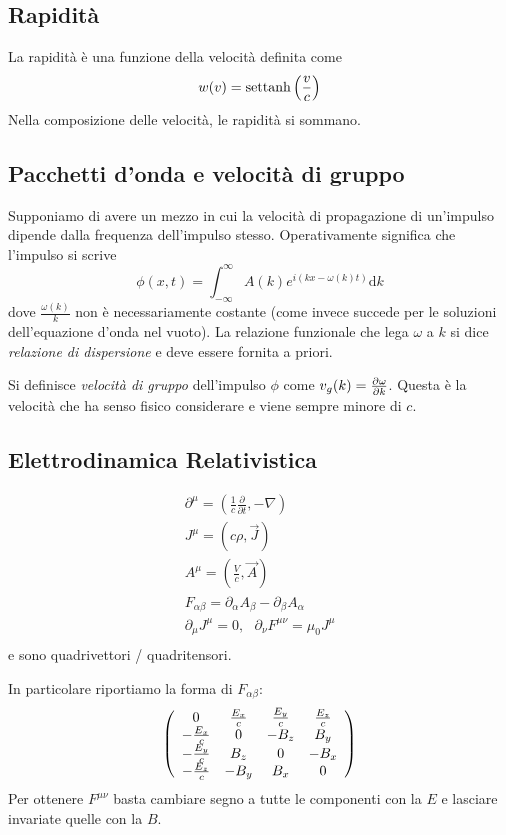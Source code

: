\documentclass[10pt,a4paper]{article}
\newcommand{\de}{{\ensuremath{ \mbox{d}}}}
\begin{document}
\begin{multicols}{2}
  \subsection*{Rapidità}
  La rapidità è una funzione della velocità definita come
  $$ w(v) = \text{settanh} \left({\frac{v}{c}}\right) $$
  Nella composizione delle velocità, le rapidità si sommano.

  \subsection*{Pacchetti d'onda e velocità di gruppo}
  Supponiamo di avere un mezzo in cui la velocità di propagazione di un'impulso dipende dalla frequenza dell'impulso stesso. Operativamente significa che l'impulso si scrive
  $$ \phi(x, t) = \int_{-\infty}^{\infty} A(k) e^{i(k x - \omega(k) t)} \de k$$
  dove $\frac{\omega(k)}{k}$ non è necessariamente costante (come invece succede per le soluzioni dell'equazione d'onda nel vuoto). La relazione funzionale che lega $\omega$ a $k$ si dice {\it relazione di dispersione} e deve essere fornita a priori.

  Si definisce {\it velocità di gruppo} dell'impulso $\phi$ come $v_g(k) = \frac{\partial {\omega}}{\partial {k}}$. Questa è la velocità che ha senso fisico considerare e viene sempre minore di $c$.

  \subsection*{Elettrodinamica Relativistica}
  \begin{displaymath}
    \begin{array}{c}
      \partial^{\mu}=(\frac{1}{c} \frac{\partial}{\partial t},-\nabla)\\
      J^\mu = (c\rho, \vec J) \\
      A^\mu = (\frac{V}{c}, \vec A) \\
      F_{\alpha\beta} = \partial_\alpha A_\beta - \partial_\beta A_\alpha \\
      \partial_{\mu}J^{\mu}=0, \, \, \, \, \partial_{\nu}F^{\mu \nu}=\mu_0 J^{\mu} \\
    \end{array}
  \end{displaymath}
  e sono quadrivettori / quadritensori.

  In particolare riportiamo la forma di $F_{\alpha\beta}$:
  \begin{displaymath}
    \left({
      \begin{array}{cccc}
        0               & \frac{E_x}{c} & \frac{E_y}{c} & \frac{E_z}{c} \\
        - \frac{E_x}{c} & 0             & - B_z         & B_y           \\
        - \frac{E_y}{c} & B_z           & 0             & - B_x         \\
        - \frac{E_z}{c} & - B_y         & B_x           & 0             \\
      \end{array}
    }\right)
  \end{displaymath}
  Per ottenere $F^{\mu\nu}$ basta cambiare segno a tutte le componenti con la $E$ e lasciare invariate quelle con la $B$.
  

\end{multicols}
\end{document}
